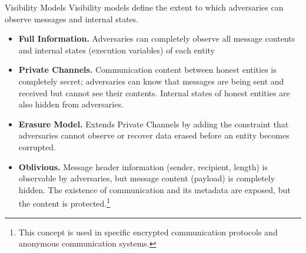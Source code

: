 \documentclass[aspectratio=169,10pt]{beamer}
\newenvironment{outlineblock}[1][]
{\begin{tcolorbox}[colframe=black, colback=white, boxrule=1pt, boxsep=5pt]}
{\end{tcolorbox}}
\begin{document}
\begin{frame}{Visibility Models}
Visibility models define the extent to which adversaries can observe messages and internal states.

\begin{itemize}
    \item \textbf{Full Information. }Adversaries can completely observe all message contents and internal states (execution variables) of each entity
    
    \item \textbf{Private Channels.} Communication content between honest entities is completely secret; adversaries can know that messages are being sent and received but cannot see their contents. Internal states of honest entities are also hidden from adversaries.
    
    \item \textbf{Erasure Model. }Extends Private Channels by adding the constraint that adversaries cannot observe or recover data erased before an entity becomes corrupted.
    
    \item \textbf{Oblivious.} Message header information (sender, recipient, length) is observable by adversaries, but message content (payload) is completely hidden. The existence of communication and its metadata are exposed, but the content is protected.\footnote{This concept is used in specific encrypted communication protocols and anonymous communication systems.}
\end{itemize}


\end{frame}
\end{document}
